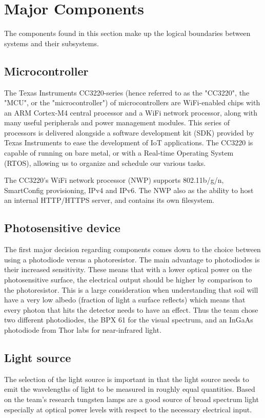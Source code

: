 \documentclass[journal]{IEEEtran}
\begin{document}
\section{Major Components} \label{sec:major-components}
The components found in this section make up the logical boundaries between systems and their
subsystems.
\subsection{Microcontroller}
The Texas Instruments CC3220-series (hence referred to as the "CC3220", the "MCU", or the "microcontroller") of microcontrollers are WiFi-enabled chips with an ARM Cortex-M4 central processor and a WiFi network processor, along with many useful peripherals and power management modules. This series of processors is delivered alongside a software development kit (SDK) provided by Texas Instruments to ease the development of IoT applications. The CC3220 is capable of running on bare metal, or with a Real-time Operating System (RTOS), allowing us to organize and schedule our various tasks.

The CC3220's WiFi network processor (NWP) supports 802.11b/g/n, SmartConfig provisioning, IPv4 and IPv6. The NWP also as the ability to host an internal HTTP/HTTPS server, and contains its own filesystem.
\subsection{Photosensitive device}
The first major decision regarding components comes down to the choice between using a photodiode versus
a photoresistor. The main advantage to photodiodes is their increased sensitivity. These means that with a lower
optical power on the photosensitive surface, the electrical output should be higher by comparison to the photoresistor.
This is a large consideration when understanding that soil will have a very low albedo (fraction of light a surface reflects)
which means that every photon that hits the detector needs to have an effect.
Thus the team chose two different photodiodes, the BPX 61 for the visual spectrum, and an InGaAs photodiode from Thor labs
for near-infrared light.
\subsection{Light source}
The selection of the light source is important in that the light source needs to emit the wavelengths
of light to be measured in roughly equal quantities. Based on the team's research tungsten lamps are a good source
of broad spectrum light especially at optical power levels with respect to the necessary electrical input.
\end{document}

